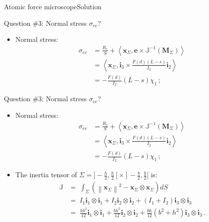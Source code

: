 \documentclass{beamer}
\newcommand{\id}{d}
\newcommand{\xj}{x}
\newcommand{\xv}{{\boldsymbol\xj}}
\newcommand{\ej}{e}
\renewcommand{\ij}{i}
\newcommand{\ev}{{\boldsymbol\ej}}
\newcommand{\iv}{{\boldsymbol\ij}}
\newcommand*{\xiu}{\chi_1}
\newcommand*{\Mstaticj}{J}
\newcommand*{\Mstatic}{{\mathbb\Mstaticj}}
\newcommand*{\stressj}{\sigma}
\newcommand{\Fresj}{R}
\newcommand{\Mresj}{M}
\newcommand{\Mres}{{\boldsymbol\Mresj}}
\newcommand{\scal}[1]{\left\langle{#1}\right\rangle}
\newcommand{\norm}[1]{\left\|#1\right\|}
\begin{document}
\begin{frame}{Atomic force microscope}{Solution}

\begin{overprint}

\vskip-20pt
\begin{exampleblock}{Question \#3: Normal stress $\stressj_{ee}$?}
\begin{itemize}
\item Normal stress:
\begin{displaymath}
\begin{split}
\stressj_{ee} &=\frac{\Fresj_e}{S}+\scal{\xv_\Sigma,\ev\times\Mstatic^{-1}(\Mres_\Sigma)} \\
&=\scal{\xv_\Sigma,\iv_3\times \frac{F(d)(L-s)}{I_2}\iv_2}\\
&=- \frac{F(d)}{I_2}(L-s)\xiu\,;
\end{split}
\end{displaymath}
\end{itemize}
\end{exampleblock}

\vskip-20pt
\begin{exampleblock}{Question \#3: Normal stress $\stressj_{ee}$?}
\begin{itemize}
\item Normal stress:
\begin{displaymath}
\begin{split}
\stressj_{ee} &=\frac{\Fresj_e}{S}+\scal{\xv_\Sigma,\ev\times\Mstatic^{-1}(\Mres_\Sigma)} \\
&=\scal{\xv_\Sigma,\iv_3\times \frac{F(d)(L-s)}{I_2}\iv_2}\\
&=- \frac{F(d)}{I_2}(L-s)\xiu\,;
\end{split}
\end{displaymath}
\item The inertia tensor of $\Sigma=]-\frac{h}{2},\frac{h}{2}[\times]-\frac{b}{2},\frac{b}{2}[$ is:
\begin{displaymath}
\begin{split}
\scriptstyle \Mstatic &= \;\scriptstyle \int_\Sigma(\norm{\xv_\Sigma}^2-\xv_\Sigma\otimes\xv_\Sigma)\id S \\
&= \;\scriptstyle I_1\iv_1\otimes\iv_1+I_2\iv_2\otimes\iv_2+(I_1+I_2)\iv_3\otimes\iv_3 \\
&= \;\scriptstyle \frac{hb^3}{12}\iv_1\otimes\iv_1+\frac{bh^3}{12}\iv_2\otimes\iv_2+\frac{bh}{12}(b^2+h^2)\iv_3\otimes\iv_3 \,.
\end{split}
\end{displaymath}
\end{itemize}
\end{exampleblock}


\end{overprint}
\end{frame}
\end{document}
